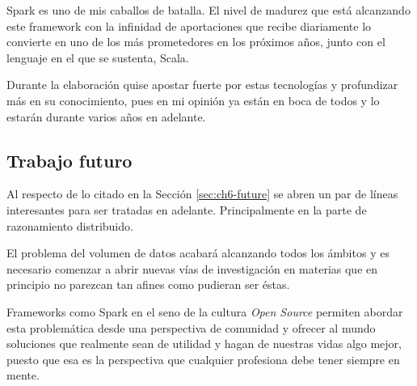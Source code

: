 Spark es uno de mis caballos de batalla. El nivel de madurez que está alcanzando
este framework con la infinidad de aportaciones que recibe diariamente lo
convierte en uno de los más prometedores en los próximos años, junto con el
lenguaje en el que se sustenta, Scala. 

Durante la elaboración quise apostar fuerte por estas tecnologías y profundizar
más en su conocimiento, pues en mi opinión ya están en boca de todos y lo
estarán durante varios años en adelante. 

\subsection{Trabajo futuro}


Al respecto de lo citado en la Sección \ref{sec:ch6-future} se abren un par de
líneas interesantes para ser tratadas en adelante. Principalmente en la parte de
razonamiento distribuido. 

El problema del volumen de datos acabará alcanzando todos los ámbitos y es
necesario comenzar a abrir nuevas vías de investigación en materias que en
principio no parezcan tan afines como pudieran ser éstas. 

Frameworks como Spark en el seno de la cultura \textit{Open Source} permiten
abordar esta problemática desde una perspectiva de comunidad y ofrecer al mundo
soluciones que realmente sean de utilidad y hagan de nuestras vidas algo mejor,
puesto que esa es la perspectiva que cualquier profesiona debe tener siempre en
mente. 

